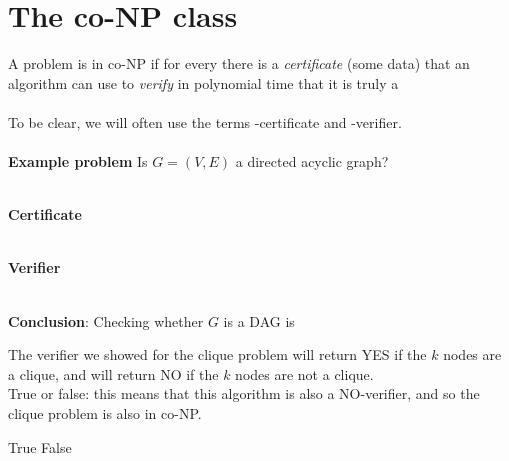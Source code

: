 \documentclass[11  pt]{article}
\begin{document}
	
	
	\section{The co-NP class}
	A problem is in co-NP if for every  there is a \emph{certificate} (some data) that an algorithm can use to \emph{verify} in polynomial time that it is truly a  \\ \\
	
	To be clear, we will often use the terms -certificate and -verifier. \\ \\
	
	
	\textbf{Example problem} Is $G = (V,E)$ a directed acyclic graph? \\ \\
	
	\vs{2cm}
	
	\textbf{Certificate} \\ \\ %
	
	\vs{2cm}
	
	\textbf{Verifier} \\ \\ %
	
	
	\vfill
	
	\textbf{Conclusion}: Checking whether $G$ is a DAG is   \\
	\vs{1cm}
	
	\newpage
	
	\begin{Qu}
		The verifier we showed for the clique problem will return YES if the $k$ nodes are a clique, and will return NO if the $k$ nodes are not a clique. \\
		
		True or false: this means that this algorithm is also a NO-verifier, and so the clique problem is also in co-NP.
		\begin{itemize}
			\aitem True
			\bitem False
		\end{itemize}
		
		
	\end{Qu}
	
\end{document}
